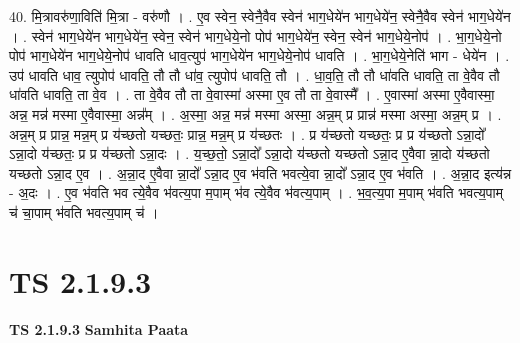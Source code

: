 \documentclass[17pt]{extarticle}
\begin{document}
40. मि॒त्रावरु॑णा॒विति॑ मि॒त्रा - वरु॑णौ । . ए॒व स्वेन॒ स्वेनै॒वैव स्वेन॑ भाग॒धेये॑न भाग॒धेये॑न॒ स्वेनै॒वैव स्वेन॑ भाग॒धेये॑न । . स्वेन॑ भाग॒धेये॑न भाग॒धेये॑न॒ स्वेन॒ स्वेन॑ भाग॒धेये॒नो पोप॑ भाग॒धेये॑न॒ स्वेन॒ स्वेन॑ भाग॒धेये॒नोप॑ । . भा॒ग॒धेये॒नो पोप॑ भाग॒धेये॑न भाग॒धेये॒नोप॑ धावति धाव॒त्युप॑ भाग॒धेये॑न भाग॒धेये॒नोप॑ धावति । . भा॒ग॒धेये॒नेति॑ भाग - धेये॑न । . उप॑ धावति धाव॒ त्युपोप॑ धावति॒ तौ तौ धा॑व॒ त्युपोप॑ धावति॒ तौ । . धा॒व॒ति॒ तौ तौ धा॑वति धावति॒ ता वे॒वैव तौ धा॑वति धावति॒ ता वे॒व । . ता वे॒वैव तौ ता वे॒वास्मा॑ अस्मा ए॒व तौ ता वे॒वास्मै᳚ । . ए॒वास्मा॑ अस्मा ए॒वैवास्मा॒ अन्न॒ मन्न॑ मस्मा ए॒वैवास्मा॒ अन्न᳚म् । . अ॒स्मा॒ अन्न॒ मन्न॑ मस्मा अस्मा॒ अन्न॒म् प्र प्रान्न॑ मस्मा अस्मा॒ अन्न॒म् प्र । . अन्न॒म् प्र प्रान्न॒ मन्न॒म् प्र य॑च्छतो यच्छतः॒ प्रान्न॒ मन्न॒म् प्र य॑च्छतः । . प्र य॑च्छतो यच्छतः॒ प्र प्र य॑च्छतो ऽन्ना॒दो᳚ ऽन्ना॒दो य॑च्छतः॒ प्र प्र य॑च्छतो ऽन्ना॒दः । . य॒च्छ॒तो॒ ऽन्ना॒दो᳚ ऽन्ना॒दो य॑च्छतो यच्छतो ऽन्ना॒द ए॒वैवा न्ना॒दो य॑च्छतो यच्छतो ऽन्ना॒द ए॒व । . अ॒न्ना॒द ए॒वैवा न्ना॒दो᳚ ऽन्ना॒द ए॒व भ॑वति भवत्ये॒वा न्ना॒दो᳚ ऽन्ना॒द ए॒व भ॑वति । . अ॒न्ना॒द इत्य॑न्न - अ॒दः । . ए॒व भ॑वति भव त्ये॒वैव भ॑वत्य॒पा म॒पाम् भ॑व त्ये॒वैव भ॑वत्य॒पाम् । . भ॒व॒त्य॒पा म॒पाम् भ॑वति भवत्य॒पाम् च॑ चा॒पाम् भ॑वति भवत्य॒पाम् च॑ । \newline
\pagebreak
{}

\section{ TS 2.1.9.3 }

\textbf{TS 2.1.9.3 } \newline
\textbf{Samhita Paata} \newline
\end{document}

